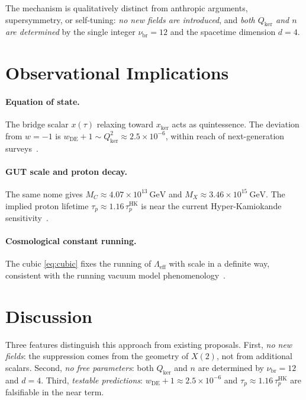 \documentclass[12pt]{article}
\begin{document}
The mechanism is qualitatively distinct from
anthropic arguments, supersymmetry, or self-tuning:
\emph{no new fields are introduced},
and \emph{both $Q_{\mathrm{ker}}$ and $n$ are determined} by the single
integer $\nu_{\mathrm{br}}=12$ and the spacetime dimension $d=4$.

\section{Observational Implications}

\paragraph{Equation of state.}
The bridge scalar $x(\tau)$ relaxing toward $x_{\mathrm{ker}}$
acts as quintessence.
The deviation from $w=-1$ is
$w_{\mathrm{DE}}+1\sim Q_{\mathrm{ker}}^2\approx2.5\times10^{-6}$,
within reach of next-generation surveys~\cite{DESI2024}.

\paragraph{GUT scale and proton decay.}
The same nome gives
$M_C\approx4.07\times10^{13}~\mathrm{GeV}$
and $M_X\approx3.46\times10^{15}~\mathrm{GeV}$.
The implied proton lifetime $\tau_p\approx1.16\,\tau_p^{\mathrm{HK}}$
is near the current Hyper-Kamiokande sensitivity~\cite{HyperK2023}.

\paragraph{Cosmological constant running.}
The cubic \eqref{eq:cubic} fixes the running of $\Lambda_{\mathrm{eff}}$
with scale in a definite way, consistent with the running vacuum
model phenomenology~\cite{SolaPer2022}.

\section{Discussion}

Three features distinguish this approach from existing proposals.
First, \emph{no new fields}: the suppression comes from the
geometry of $X(2)$, not from additional scalars.
Second, \emph{no free parameters}: both $Q_{\mathrm{ker}}$ and $n$
are determined by $\nu_{\mathrm{br}}=12$ and $d=4$.
Third, \emph{testable predictions}: $w_{\mathrm{DE}}+1\approx2.5\times10^{-6}$
and $\tau_p\approx1.16\,\tau_p^{\mathrm{HK}}$ are falsifiable in the near term.
\end{document}
